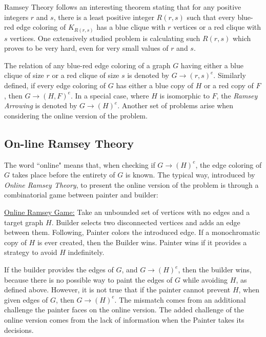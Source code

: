 Ramsey Theory follows an interesting theorem stating that for any positive integers $r$ and $s$, there is a least positive integer $R(r,s)$ such that every blue-red edge coloring of $K_{R(r,s)}$ has a blue clique with $r$ vertices or a red clique with $s$ vertices. One extensively studied problem is calculating such $R(r,s)$ which proves to be very hard, even for very small values of $r$ and $s$. 

The relation of any blue-red edge coloring of a graph $G$ having either a blue clique of size $r$ or a red clique of size $s$ is denoted by $G\rightarrow(r,s)^e$. Similarly defined, if every edge coloring of $G$ has either a blue copy of $H$ or a red copy of $F$, then $G\rightarrow(H,F)^e$. In a special case, where $H$ is isomorphic to $F$, the \textit{Ramsey Arrowing} is denoted by $G\rightarrow(H)^e$. Another set of problems arise when considering the online version of the problem.

\subsection*{On-line Ramsey Theory\cite{1}}

The word ``online" means that, when checking if $G\rightarrow(H)^e$, the edge coloring of $G$ takes place before the entirety of $G$ is known. The typical way, introduced by \textit{Online Ramsey Theory}\cite{1}, to present the online version of the problem is through a combinatorial game between painter and builder:

\begin{adjustwidth}{2em}{2em}
	\noindent\underline{Online Ramsey Game:}
	Take an unbounded set of vertices with no edges and a target graph $H$. Builder selects two disconnected vertices and adds an edge between them. Following, Painter colors the introduced edge. If a monochromatic copy of $H$ is ever created, then the Builder wins. Painter wins if it provides a strategy to avoid $H$ indefinitely.
\end{adjustwidth}

If the builder provides the edges of $G$, and $G\rightarrow(H)^e$, then the builder wins, because there is no possible way to paint the edges of $G$ while avoiding $H$, as defined above. However, it is not true that if the painter cannot prevent $H$, when given edges of $G$, then $G\rightarrow(H)^e$. The mismatch comes from an additional challenge the painter faces on the online version. The added challenge of the online version comes from the lack of information when the Painter takes its decisions.

